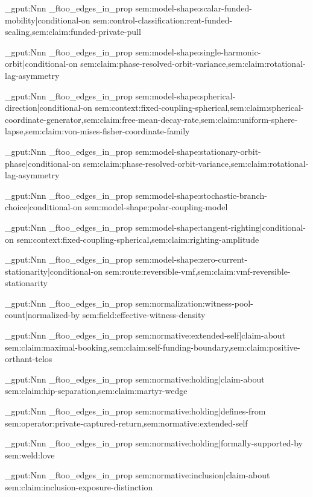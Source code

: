 \prop_gput:Nnn \g_ftoo_edges_in_prop { sem:model-shape:scalar-funded-mobility|conditional-on } { sem:control-classification:rent-funded-sealing,sem:claim:funded-private-pull }

\prop_gput:Nnn \g_ftoo_edges_in_prop { sem:model-shape:single-harmonic-orbit|conditional-on } { sem:claim:phase-resolved-orbit-variance,sem:claim:rotational-lag-asymmetry }

\prop_gput:Nnn \g_ftoo_edges_in_prop { sem:model-shape:spherical-direction|conditional-on } { sem:context:fixed-coupling-spherical,sem:claim:spherical-coordinate-generator,sem:claim:free-mean-decay-rate,sem:claim:uniform-sphere-lapse,sem:claim:von-mises-fisher-coordinate-family }

\prop_gput:Nnn \g_ftoo_edges_in_prop { sem:model-shape:stationary-orbit-phase|conditional-on } { sem:claim:phase-resolved-orbit-variance,sem:claim:rotational-lag-asymmetry }

\prop_gput:Nnn \g_ftoo_edges_in_prop { sem:model-shape:stochastic-branch-choice|conditional-on } { sem:model-shape:polar-coupling-model }

\prop_gput:Nnn \g_ftoo_edges_in_prop { sem:model-shape:tangent-righting|conditional-on } { sem:context:fixed-coupling-spherical,sem:claim:righting-amplitude }

\prop_gput:Nnn \g_ftoo_edges_in_prop { sem:model-shape:zero-current-stationarity|conditional-on } { sem:route:reversible-vmf,sem:claim:vmf-reversible-stationarity }

\prop_gput:Nnn \g_ftoo_edges_in_prop { sem:normalization:witness-pool-count|normalized-by } { sem:field:effective-witness-density }

\prop_gput:Nnn \g_ftoo_edges_in_prop { sem:normative:extended-self|claim-about } { sem:claim:maximal-booking,sem:claim:self-funding-boundary,sem:claim:positive-orthant-telos }

\prop_gput:Nnn \g_ftoo_edges_in_prop { sem:normative:holding|claim-about } { sem:claim:hip-separation,sem:claim:martyr-wedge }

\prop_gput:Nnn \g_ftoo_edges_in_prop { sem:normative:holding|defines-from } { sem:operator:private-captured-return,sem:normative:extended-self }

\prop_gput:Nnn \g_ftoo_edges_in_prop { sem:normative:holding|formally-supported-by } { sem:weld:love }

\prop_gput:Nnn \g_ftoo_edges_in_prop { sem:normative:inclusion|claim-about } { sem:claim:inclusion-exposure-distinction }

